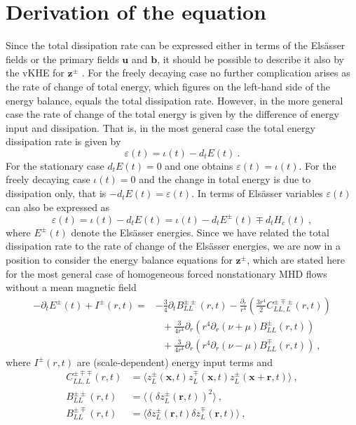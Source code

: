 \documentclass[aps,pre,onecolumn,superscriptaddress,notitlepage]{revtex4-1}
\newcommand{\vep}{\varepsilon}
\renewcommand{\vec}[1]{\bm{#1}}
\newcommand{\beq}{\begin{equation}}
\newcommand{\eeq}{\end{equation}}
\begin{document}
\section{Derivation of the equation} 
\label{sec:derivation}
Since the total dissipation rate can be expressed either in terms of the Els\"{a}sser 
fields or the primary fields $\vec{u}$ and $\vec{b}$, it should be possible to describe it also 
by the vKHE for $\vec{z}^\pm$ \cite{Politano98}. For the freely decaying case 
no further complication arises as the rate of change of total energy, which figures on the left-hand side
of the energy balance, equals the total dissipation rate.   
However, in the more general case the rate of change of the total energy 
is given by the difference of energy input and dissipation. That is, 
in the most general case the total energy dissipation rate is given by
\beq
\vep(t) =\iota(t) -d_t E (t)\ .
\eeq  
For the stationary case $d_t E (t)=0$ and one obtains $\vep(t)=\iota(t)$.
For the freely decaying case $\iota(t) = 0$ and the change in total energy is due to 
dissipation only, that is $-d_t E (t)=\vep(t)$. 
In terms of Els\"asser variables $\vep(t)$ can also be expressed as
\beq
\vep(t) = \iota(t)-d_t E(t) = \iota(t) - d_tE^\pm(t) \mp d_tH_c(t) \ ,
\eeq
where $E^\pm(t)$ denote the Els\"asser energies. Since we have related the total dissipation rate 
to the rate of change of the Els\"asser energies, we are now in a position to consider the energy 
balance equations for $\vec{z}^\pm$, which are
stated here for the most general case of homogeneous forced nonstationary MHD flows without a mean 
magnetic field
\begin{align}
-\partial_t E^\pm(t) +I^\pm(r,t)  
 = & -\frac{3}{4} \partial_t B_{LL}^{\pm\pm}(r,t) - \frac{\partial_r}{r^4}
\left(\frac{3r^4}{2}C^{\pm\mp\pm}_{LL,L}(r,t) \right) \nonumber \\
& \ \ \ +\frac{3}{4r^4} \partial_r \left(r^4 \partial_r(\nu+\mu)B^{\pm}_{LL}(r,t) \right) \nonumber \\
& \ \ \ +\frac{3}{4r^4} \partial_r \left(r^4 \partial_r(\nu-\mu)B^{\mp}_{LL}(r,t) \right) \ ,
\label{eq:elsasser_balance}
\end{align}
where $I^\pm(r,t)$ are (scale-dependent) energy input terms and 
\begin{align}
C^{\pm\mp\mp}_{LL,L}(r,t)&= \langle z_L^\pm(\vec{x},t) z_L^\mp(\vec{x},t) z_L^\pm(\vec{x} + \vec{r},t) \rangle \ ,  \\
B_{LL}^{\pm\pm}(r,t)&= \langle (\delta z_L^\pm(\vec{r},t))^2 \rangle \ , \\ 
B_{LL}^{\pm\mp}(r,t)&= \langle \delta z_L^\pm(\vec{r},t) \delta z_L^\mp(\vec{r},t) \rangle \ , 
\end{align}
\end{document}
